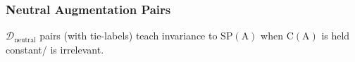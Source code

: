 \subsubsection{Neutral Augmentation Pairs}
$\mathcal{D}_{\mathrm{neutral}}$ pairs (with tie-labels) teach invariance to $\mathrm{SP}(\mathrm{A})$ when $\mathrm{C}(\mathrm{A})$ is held constant/ is irrelevant.










